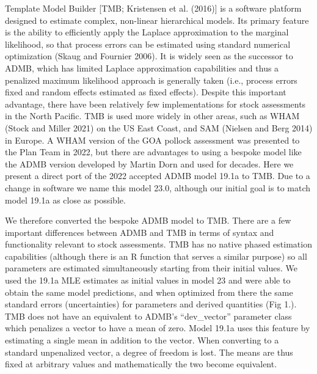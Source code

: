 \documentclass[
]{article}
\begin{document}
Template Model Builder {[}TMB; Kristensen et al. (2016){]} is a software
platform designed to estimate complex, non-linear hierarchical models.
Its primary feature is the ability to efficiently apply the Laplace
approximation to the marginal likelihood, so that process errors can be
estimated using standard numerical optimization (Skaug and Fournier
2006). It is widely seen as the successor to ADMB, which has limited
Laplace approximation capabilities and thus a penalized maximum
likelihood approach is generally taken (i.e., process errors fixed and
random effects estimated as fixed effects). Despite this important
advantage, there have been relatively few implementations for stock
assessments in the North Pacific. TMB is used more widely in other
areas, such as WHAM (Stock and Miller 2021) on the US East Coast, and
SAM (Nielsen and Berg 2014) in Europe. A WHAM version of the GOA pollock
assessment was presented to the Plan Team in 2022, but there are
advantages to using a bespoke model like the ADMB version developed by
Martin Dorn and used for decades. Here we present a direct port of the
2022 accepted ADMB model 19.1a to TMB. Due to a change in software we
name this model 23.0, although our initial goal is to match model 19.1a
as close as possible.

We therefore converted the bespoke ADMB model to TMB. There are a few
important differences between ADMB and TMB in terms of syntax and
functionality relevant to stock assessments. TMB has no native phased
estimation capabilities (although there is an R function that serves a
similar purpose) so all parameters are estimated simultaneously starting
from their initial values. We used the 19.1a MLE estimates as initial
values in model 23 and were able to obtain the same model predictions,
and when optimized from there the same standard errors (uncertainties)
for parameters and derived quantities (Fig 1.). TMB does not have an
equivalent to ADMB's ``dev\_vector'' parameter class which penalizes a
vector to have a mean of zero. Model 19.1a uses this feature by
estimating a single mean in addition to the vector. When converting to a
standard unpenalized vector, a degree of freedom is lost. The means are
thus fixed at arbitrary values and mathematically the two become
equivalent.
\end{document}
